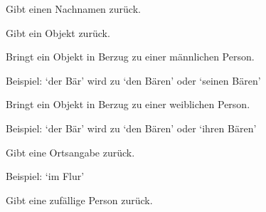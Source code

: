 \documentclass[a4paper,12pt,oneside]{sphinxmanual}
\begin{document}

\begin{fulllineitems}
\label{funktionen:pyzufall.nachname}
Gibt einen Nachnamen zurück.

\end{fulllineitems}


\begin{fulllineitems}
\label{funktionen:pyzufall.objekt}
Gibt ein Objekt zurück.

\end{fulllineitems}


\begin{fulllineitems}
\label{funktionen:pyzufall.objekt_m}
Bringt ein Objekt in Berzug zu einer männlichen Person.

Beispiel:
`der Bär' wird zu `den Bären' oder `seinen Bären'

\end{fulllineitems}


\begin{fulllineitems}
\label{funktionen:pyzufall.objekt_w}
Bringt ein Objekt in Berzug zu einer weiblichen Person.

Beispiel:
`der Bär' wird zu `den Bären' oder `ihren Bären'

\end{fulllineitems}


\begin{fulllineitems}
\label{funktionen:pyzufall.ort}
Gibt eine Ortsangabe zurück.

Beispiel: `im Flur'

\end{fulllineitems}


\begin{fulllineitems}
\label{funktionen:pyzufall.person}
Gibt eine zufällige Person zurück.

\end{fulllineitems}
\end{document}
